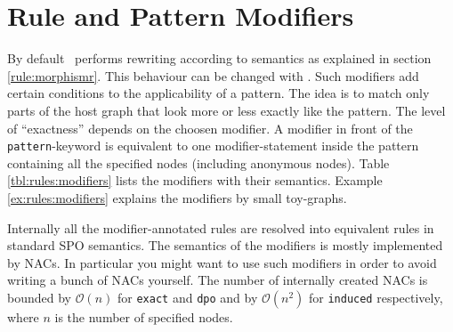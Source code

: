 \section{Rule and Pattern Modifiers} 
\label{sct:patternmodifier}
By default \GrG\ performs rewriting according to  semantics as explained in section \ref{rule:morphismr}.
This behaviour can be changed with .
Such modifiers add certain conditions to the applicability of a pattern.
The idea is to match only parts of the host graph that look more or less exactly like the pattern.
The level of ``exactness'' depends on the choosen modifier.
A modifier in front of the \texttt{pattern}-keyword is equivalent to one modifier-statement inside the pattern containing all the specified nodes (including anonymous nodes).
Table \ref{tbl:rules:modifiers} lists the modifiers with their semantics.
Example \ref{ex:rules:modifiers} explains the modifiers by small toy-graphs.
\begin{note}
    Internally all the modifier-annotated rules are resolved into equivalent rules in standard SPO semantics.
    The semantics of the modifiers is mostly implemented by NACs.
    In particular you might want to use such modifiers in order to avoid writing a bunch of NACs yourself.
    The number of internally created NACs is bounded by $\mathcal{O}(n)$ for \texttt{exact} and \texttt{dpo} and by $\mathcal{O}(n^2)$ for \texttt{induced} respectively, where $n$ is the number of specified nodes.
\end{note} 
